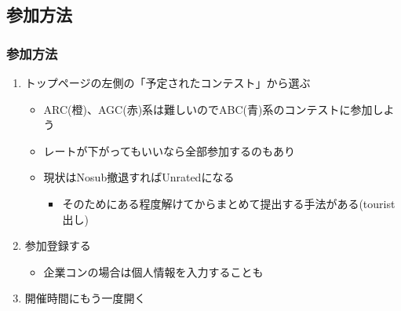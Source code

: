 \documentclass[t, aspectratio=169, dvipdfmx]{beamer}
\begin{document}
\subsection{参加方法}
\begin{frame}
  \frametitle{参加方法}
  \begin{enumerate}
    \item トップページの左側の「予定されたコンテスト」から選ぶ
    \begin{itemize}
      \item ARC(橙)、AGC(赤)系は難しいのでABC(青)系のコンテストに参加しよう
      \item レートが下がってもいいなら全部参加するのもあり
      \item 現状はNosub撤退すればUnratedになる
      \begin{itemize}
        \item そのためにある程度解けてからまとめて提出する手法がある(tourist出し)
      \end{itemize}
    \end{itemize}
    \item 参加登録する
    \begin{itemize}
      \item 企業コンの場合は個人情報を入力することも
    \end{itemize}
    \item 開催時間にもう一度開く
  \end{enumerate}
\end{frame}
\end{document}
